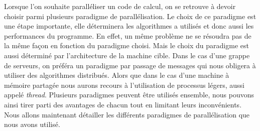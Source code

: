 Lorsque l'on souhaite paralléliser un code de calcul, on se retrouve à devoir choisir parmi plusieurs paradigme de parallélisation.
%
Le choix de ce paradigme est une étape importante, elle déterminera les algorithmes a utilisés et donc aussi les performances du programme.
%
En effet, un même problème ne se résoudra pas de la même façon en fonction du paradigme choisi.
%
Mais le choix du paradigme est aussi déterminé par l'architecture de la machine cible.
%
Dans le cas d'une grappe de serveurs, on préféra un paradigme par passage de messages qui nous obligera à utiliser des algorithmes distribués.
%
Alors que dans le cas d'une machine à mémoire partagée nous aurons recours à l'utilisation de processus légers, aussi appelé {\em thread}.
%
Plusieurs paradigmes peuvent être utilisés ensemble, nous pouvons ainsi tirer parti des avantages de chacun tout en limitant leurs inconvénients.
%
Nous allons maintenant détailler les différents paradigmes de parallélisation que nous avons utilisé.
